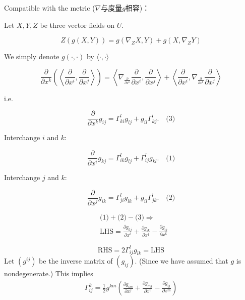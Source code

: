 Compatible with the metric ($\nabla$与度量$g$相容)：

Let \( X, Y, Z \) be three vector fields on \( U \).

\[
Z(g(X,Y)) = g(\nabla_Z X, Y) + g(X, \nabla_Z Y)
\]

We simply denote \( g(\cdot,\cdot) \) by \( \langle\cdot,\cdot\rangle \)



\[
\frac{\partial}{\partial x^k} \left( \left\langle \frac{\partial}{\partial x^i}, \frac{\partial}{\partial x^j} \right\rangle \right) 
= \left\langle \nabla_{\frac{\partial}{\partial x^k}} \frac{\partial}{\partial x^i}, \frac{\partial}{\partial x^j} \right\rangle 
+ \left\langle \frac{\partial}{\partial x^i}, \nabla_{\frac{\partial}{\partial x^k}} \frac{\partial}{\partial x^j} \right\rangle
\]

i.e.

\[
\frac{\partial}{\partial x^k} g_{ij} = \Gamma_{ki}^l g_{lj} + g_{il} \Gamma_{kj}^l . \quad \text{(3)}
\]

Interchange \( i \) and \( k \):

\[
\frac{\partial}{\partial x^i} g_{kj} = \Gamma_{ik}^l g_{lj} + \Gamma_{ij}^l g_{kl} . \quad \text{(1)}
\]

Interchange \( j \) and \( k \):

\[
\frac{\partial}{\partial x^j} g_{ik} = \Gamma_{ji}^l g_{lk} + g_{il} \Gamma_{jk}^l . \quad \text{(2)}
\]

\begin{equation*}
\begin{aligned}
&\text{(1)} + \text{(2)} - \text{(3)} \Rightarrow \\
&\text{LHS} = \frac{\partial g_{kj}}{\partial x^i} + \frac{\partial g_{ik}}{\partial x^j} - \frac{\partial g_{ij}}{\partial x^k}
\end{aligned}
\end{equation*}

\[\text{RHS} = 2 \Gamma_{ij}^l g_{lk} = \text{LHS} \]
{Let } $(g^{ij})$  be the inverse matrix of  $(g_{ij})$. 
(Since we have assumed that  $g$  is nondegenerate.)
This implies 
\begin{equation*}
\begin{aligned}
\Gamma_{ij}^k = \frac{1}{2} g^{km} \left( \frac{\partial g_{im}}{\partial x^j} + \frac{\partial g_{mj}}{\partial x^i} - \frac{\partial g_{ij}}{\partial x^m} \right)
\end{aligned}
\end{equation*}



